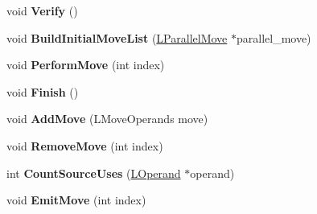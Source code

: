 \begin{DoxyCompactItemize}
\item 
void {\bfseries Verify} ()\hypertarget{classv8_1_1internal_1_1_b_a_s_e___e_m_b_e_d_d_e_d_a46f1b6e1093c631ee3b7dfca3abc94e9}{}\label{classv8_1_1internal_1_1_b_a_s_e___e_m_b_e_d_d_e_d_a46f1b6e1093c631ee3b7dfca3abc94e9}

\item 
void {\bfseries Build\+Initial\+Move\+List} (\hyperlink{classv8_1_1internal_1_1_l_parallel_move}{L\+Parallel\+Move} $\ast$parallel\+\_\+move)\hypertarget{classv8_1_1internal_1_1_b_a_s_e___e_m_b_e_d_d_e_d_a18e46b4919bd34c5ff192a955f86238d}{}\label{classv8_1_1internal_1_1_b_a_s_e___e_m_b_e_d_d_e_d_a18e46b4919bd34c5ff192a955f86238d}

\item 
void {\bfseries Perform\+Move} (int index)\hypertarget{classv8_1_1internal_1_1_b_a_s_e___e_m_b_e_d_d_e_d_a01fea4beaf81ccc3a326c14fdda8a2aa}{}\label{classv8_1_1internal_1_1_b_a_s_e___e_m_b_e_d_d_e_d_a01fea4beaf81ccc3a326c14fdda8a2aa}

\item 
void {\bfseries Finish} ()\hypertarget{classv8_1_1internal_1_1_b_a_s_e___e_m_b_e_d_d_e_d_ab548eea67f623b5c744d4cde85093de7}{}\label{classv8_1_1internal_1_1_b_a_s_e___e_m_b_e_d_d_e_d_ab548eea67f623b5c744d4cde85093de7}

\item 
void {\bfseries Add\+Move} (L\+Move\+Operands move)\hypertarget{classv8_1_1internal_1_1_b_a_s_e___e_m_b_e_d_d_e_d_a2abe82153c72385671db639992f13517}{}\label{classv8_1_1internal_1_1_b_a_s_e___e_m_b_e_d_d_e_d_a2abe82153c72385671db639992f13517}

\item 
void {\bfseries Remove\+Move} (int index)\hypertarget{classv8_1_1internal_1_1_b_a_s_e___e_m_b_e_d_d_e_d_a968e26caddd16f79466b3910de1fe216}{}\label{classv8_1_1internal_1_1_b_a_s_e___e_m_b_e_d_d_e_d_a968e26caddd16f79466b3910de1fe216}

\item 
int {\bfseries Count\+Source\+Uses} (\hyperlink{classv8_1_1internal_1_1_l_operand}{L\+Operand} $\ast$operand)\hypertarget{classv8_1_1internal_1_1_b_a_s_e___e_m_b_e_d_d_e_d_a6e49b61d01fea9e844dd9d991ce93d0a}{}\label{classv8_1_1internal_1_1_b_a_s_e___e_m_b_e_d_d_e_d_a6e49b61d01fea9e844dd9d991ce93d0a}

\item 
void {\bfseries Emit\+Move} (int index)\hypertarget{classv8_1_1internal_1_1_b_a_s_e___e_m_b_e_d_d_e_d_a50988d2a86b49713575ec93e3c922dcf}{}\label{classv8_1_1internal_1_1_b_a_s_e___e_m_b_e_d_d_e_d_a50988d2a86b49713575ec93e3c922dcf}


\end{DoxyCompactItemize}
